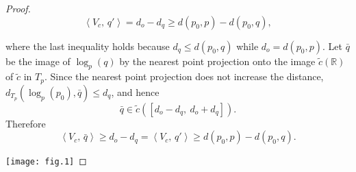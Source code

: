 \documentclass[12pt]{amsart}
\numberwithin{equation}{section}
\theoremstyle{plain}
\theoremstyle{definition}
\theoremstyle{remark}
\newcommand{\R}{{\mathbb R}}
\newcommand{\tcprj}{\log}
\newcommand{\inner}[2]{\left\langle #1,\, #2 \right\rangle}
\begin{document}
\begin{proof}
\begin{equation*}
  \inner{V_c}{q'} = d_o-d_q \geq d(p_0,p)-d(p_0,q), 
 \end{equation*}
\begin{minipage}[b]{8cm}
 where the last inequality holds because
 $d_q \leq d(p_0,q)$ while $d_o=d(p_0,p)$. 
 Let $\bar q$ be the image of $\tcprj_p(q)$ by the nearest point
 projection onto the image $\tilde c(\R)$ of $\tilde c$  in
 $T_p$. Since the nearest point projection does not increase the
 distance,
 $d_{T_p}(\tcprj_p(p_0),\bar q) \leq d_q$,
 and hence
 \begin{equation*}
  \bar q \in \tilde 
 c\left(\left[d_o-d_q,\  d_o+d_q\right]\right). 
 \end{equation*}
  Therefore
 \begin{equation*}
  \inner{V_c}{\bar q} \geq d_o-d_q
  = \inner{V_c}{q'}\geq d(p_0,p)-d(p_0,q). 
 \end{equation*}
\end{minipage} 
\begin{minipage}[b]{6cm}
 \hspace{2.5cm} 
 \texttt{[image: fig.1]}
\end{minipage}
 

\end{proof}
\end{document}
